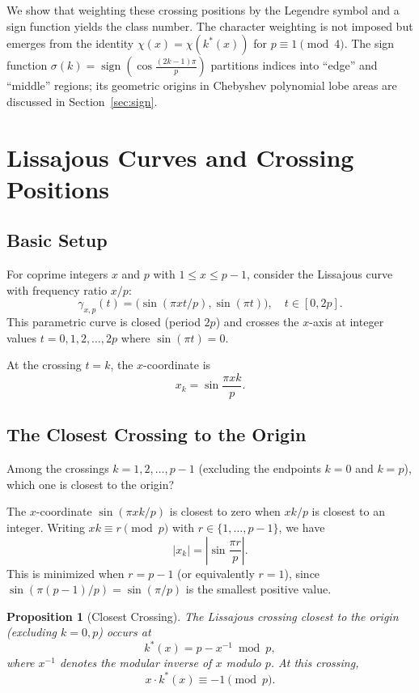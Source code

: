 \documentclass[11pt,a4paper]{article}
\newtheorem{proposition}[theorem]{Proposition}
\begin{document}
We show that weighting these crossing positions by the Legendre symbol and a sign function yields the class number. The character weighting is not imposed but emerges from the identity $\chi(x) = \chi(k^*(x))$ for $p \equiv 1 \pmod 4$. The sign function $\sigma(k) = \operatorname{sign}(\cos\frac{(2k-1)\pi}{p})$ partitions indices into ``edge'' and ``middle'' regions; its geometric origins in Chebyshev polynomial lobe areas are discussed in Section~\ref{sec:sign}.

\section{Lissajous Curves and Crossing Positions}

\subsection{Basic Setup}

For coprime integers $x$ and $p$ with $1 \leq x \leq p-1$, consider the Lissajous curve with frequency ratio $x/p$:
\[
\gamma_{x,p}(t) = \bigl(\sin(\pi x t / p), \sin(\pi t)\bigr), \quad t \in [0, 2p].
\]
This parametric curve is closed (period $2p$) and crosses the $x$-axis at integer values $t = 0, 1, 2, \ldots, 2p$ where $\sin(\pi t) = 0$.

At the crossing $t = k$, the $x$-coordinate is
\[
x_k = \sin\frac{\pi x k}{p}.
\]

\subsection{The Closest Crossing to the Origin}

Among the crossings $k = 1, 2, \ldots, p-1$ (excluding the endpoints $k = 0$ and $k = p$), which one is closest to the origin?

The $x$-coordinate $\sin(\pi x k / p)$ is closest to zero when $x k / p$ is closest to an integer. Writing $xk \equiv r \pmod p$ with $r \in \{1, \ldots, p-1\}$, we have
\[
|x_k| = \left|\sin\frac{\pi r}{p}\right|.
\]
This is minimized when $r = p - 1$ (or equivalently $r = 1$), since $\sin(\pi(p-1)/p) = \sin(\pi/p)$ is the smallest positive value.

\begin{proposition}[Closest Crossing]\label{prop:closest}
The Lissajous crossing closest to the origin (excluding $k = 0, p$) occurs at
\[
k^*(x) = p - x^{-1} \bmod p,
\]
where $x^{-1}$ denotes the modular inverse of $x$ modulo $p$. At this crossing,
\[
x \cdot k^*(x) \equiv -1 \pmod p.
\]
\end{proposition}
\end{document}
